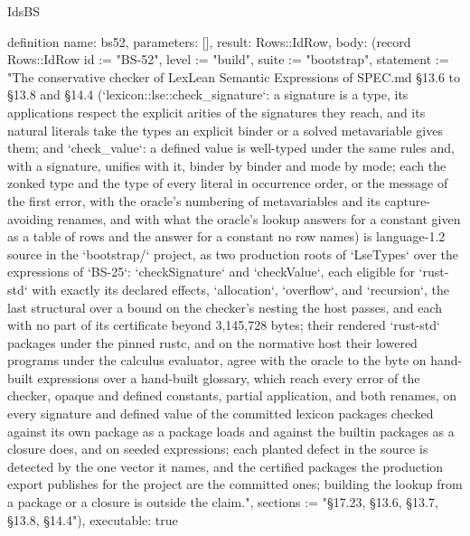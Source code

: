 \begin{lexlean}{IdsBS}
\begin{semanticmodule}
definition{
  name: bs52,
  parameters: [],
  result: Rows::IdRow,
  body: (record Rows::IdRow {id := "BS-52", level := "build", suite := "bootstrap", statement := "The conservative checker of LexLean Semantic Expressions of SPEC.md §13.6 to §13.8 and §14.4 (`lexicon::lse::check_signature`: a signature is a type, its applications respect the explicit arities of the signatures they reach, and its natural literals take the types an explicit binder or a solved metavariable gives them; and `check_value`: a defined value is well-typed under the same rules and, with a signature, unifies with it, binder by binder and mode by mode; each the zonked type and the type of every literal in occurrence order, or the message of the first error, with the oracle's numbering of metavariables and its capture-avoiding renames, and with what the oracle's lookup answers for a constant given as a table of rows and the answer for a constant no row names) is language-1.2 source in the `bootstrap/` project, as two production roots of `LseTypes` over the expressions of `BS-25`: `checkSignature` and `checkValue`, each eligible for `rust-std` with exactly its declared effects, `allocation`, `overflow`, and `recursion`, the last structural over a bound on the checker's nesting the host passes, and each with no part of its certificate beyond 3,145,728 bytes; their rendered `rust-std` packages under the pinned rustc, and on the normative host their lowered programs under the calculus evaluator, agree with the oracle to the byte on hand-built expressions over a hand-built glossary, which reach every error of the checker, opaque and defined constants, partial application, and both renames, on every signature and defined value of the committed lexicon packages checked against its own package as a package loads and against the builtin packages as a closure does, and on seeded expressions; each planted defect in the source is detected by the one vector it names, and the certified packages the production export publishes for the project are the committed ones; building the lookup from a package or a closure is outside the claim.", sections := "§17.23, §13.6, §13.7, §13.8, §14.4"}),
  executable: true
}


\end{semanticmodule}
\end{lexlean}

